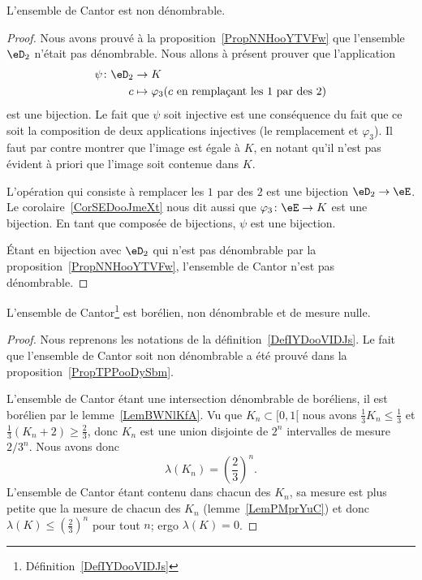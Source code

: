 \begin{proposition}    \label{PropTPPooDySbm}
    L'ensemble de Cantor est non dénombrable.
\end{proposition}

\begin{proof}

    Nous avons prouvé à la proposition~\ref{PropNNHooYTVFw} que l'ensemble \( \eD_2\) n'était pas dénombrable. Nous allons à présent prouver que l'application
    \begin{equation}
        \begin{aligned}
            \psi\colon \eD_2&\to K \\
            c&\mapsto \varphi_3(   c\text{ en remplaçant les } 1\text{ par des } 2  )
        \end{aligned}
    \end{equation}
    est une bijection. Le fait que \( \psi\) soit injective est une conséquence du fait que ce soit la composition de deux applications injectives (le remplacement et \( \varphi_3\)). Il faut par contre montrer que l'image est égale à \( K\), en notant qu'il n'est pas évident à priori que l'image soit contenue dans \( K\).

    L'opération qui consiste à remplacer les \( 1\) par des \( 2\) est une bijection \( \eD_2\to \eE\). Le corolaire~\ref{CorSEDooJmeXt} nous dit aussi que \( \varphi_3\colon \eE\to K\) est une bijection. En tant que composée de bijections, \( \psi\) est une bijection.

    Étant en bijection avec \( \eD_2\) qui n'est pas dénombrable par la proposition~\ref{PropNNHooYTVFw}, l'ensemble de Cantor n'est pas dénombrable.
\end{proof}

\begin{proposition}    \label{PropBEWooXZdKN}
    L'ensemble de Cantor\footnote{Définition~\ref{DefIYDooVIDJs}} est borélien, non dénombrable et de mesure nulle.
\end{proposition}

\begin{proof}
    Nous reprenons les notations de la définition~\ref{DefIYDooVIDJs}. Le fait que l'ensemble de Cantor soit non dénombrable a été prouvé dans la proposition~\ref{PropTPPooDySbm}.

    L'ensemble de Cantor étant une intersection dénombrable de boréliens, il est borélien par le lemme~\ref{LemBWNlKfA}. Vu que \( K_n\subset\mathopen[ 0 , 1 [\) nous avons \( \frac{1}{ 3 }K_n\leq \frac{1}{ 3 }\) et \( \frac{1}{ 3 }(K_n+2)\geq \frac{ 2 }{ 3 }\), donc \( K_n\) est une union disjointe de \( 2^n\) intervalles de mesure \( 2/3^n\). Nous avons donc
        \begin{equation}
            \lambda(K_n)=\left( \frac{ 2 }{ 3 } \right)^n.
        \end{equation}
        L'ensemble de Cantor étant contenu dans chacun des \( K_n\), sa mesure est plus petite que la mesure de chacun des \( K_n\) (lemme~\ref{LemPMprYuC}) et donc \( \lambda(K)\leq \left( \frac{ 2 }{ 3 } \right)^n\) pour tout \( n\); ergo \( \lambda(K)=0\).
\end{proof}

